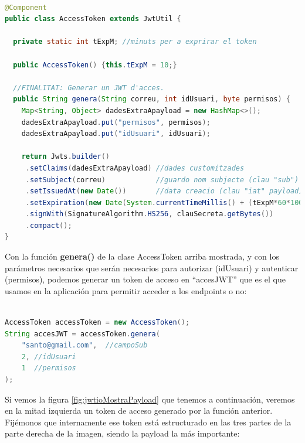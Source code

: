 \documentclass[a4paper,12pt]{report}
\begin{document}
		

		
\begin{lstlisting}[language=Java, basicstyle=\ttfamily\footnotesize, keywordstyle=\color{magenta}]
				
@Component
public class AccessToken extends JwtUtil {
	
  private static int tExpM; //minuts per a exprirar el token
	
  public AccessToken() {this.tExpM = 10;}
	
  //FINALITAT: Generar un JWT d'acces.
  public String genera(String correu, int idUsuari, byte permisos) {
	Map<String, Object> dadesExtraApayload = new HashMap<>();
	dadesExtraApayload.put("permisos", permisos);
	dadesExtraApayload.put("idUsuari", idUsuari);
		
	return Jwts.builder()
	 .setClaims(dadesExtraApayload) //dades customitzades
	 .setSubject(correu)            //guardo nom subjecte (clau "sub")
	 .setIssuedAt(new Date())       //data creacio (clau "iat" payload)
	 .setExpiration(new Date(System.currentTimeMillis() + (tExpM*60*1000)))
	 .signWith(SignatureAlgorithm.HS256, clauSecreta.getBytes())
	 .compact();
}


\end{lstlisting}
		
		
		
		Con la función \textbf{genera()} de la clase AccessToken arriba mostrada, y con los parámetros necesarios que serán necesarios para autorizar (idUsuari) y autenticar (permisos), podemos generar un token de acceso en ``accesJWT'' que es el que usamos en la aplicación para permitir acceder a los endpoints o no:
		
		
		
\begin{lstlisting}[language=Java, basicstyle=\ttfamily\footnotesize, keywordstyle=\color{magenta}]

AccessToken accessToken = new AccessToken();
String accesJWT = accessToken.genera(
	"santo@gmail.com",  //campoSub
	2, //idUsuari
	1  //permisos
);


\end{lstlisting}
		
		Si vemos la figura \ref{fig:jwtioMostraPayload} que tenemos a continuación, veremos en la mitad izquierda un token de acceso generado por la función anterior. Fijémonos que internamente ese token está estructurado en las tres partes de la parte derecha de la imagen, siendo la payload la más importante:
		
\end{document}
